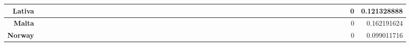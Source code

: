 \documentclass[a4paper,11pt]{report}
\begin{document}
\begin{appendices}
\begin{landscape}
\begin{longtable}{r|r|r|r|r|r|r|r|r|r|r|r|r|r|r|r|r|r|r|r|r|r|r|r|r|r|r|r|r|r|r|r|r|r|r|r|r|r|r|r|r|r|r|r|r|r|r|r|}
\multicolumn{1}{|r|}{\textbf{Lativa}}                &                  &                  &                  &                     &                  &                  &                                &                   &                  &                 &                  &                  &                           &                  &                 &                  &                  &                 &                  &                  &                  &                 &                &                 &                    &                &                  &                 &                 &                   &                  &                 &                     &                 &                   &                   &                &                 &                      &                          &                 &                  &                         &                 &                & 0                        & 0.121328888        \\ \hline
\multicolumn{1}{|r|}{\textbf{Malta}}                 &                  &                  &                  &                     &                  &                  &                                &                   &                  &                 &                  &                  &                           &                  &                 &                  &                  &                 &                  &                  &                  &                 &                &                 &                    &                &                  &                 &                 &                   &                  &                 &                     &                 &                   &                   &                &                 &                      &                          &                 &                  &                         &                 &                & 0                        & 0.162191624        \\ \hline
\multicolumn{1}{|r|}{\textbf{Norway}}                &                  &                  &                  &                     &                  &                  &                                &                   &                  &                 &                  &                  &                           &                  &                 &                  &                  &                 &                  &                  &                  &                 &                &                 &                    &                &                  &                 &                 &                   &                  &                 &                     &                 &                   &                   &                &                 &                      &                          &                 &                  &                         &                 &                & 0                        & 0.099011716        \\ \hline

\end{longtable}
\end{landscape}
\end{appendices}
\end{document}
